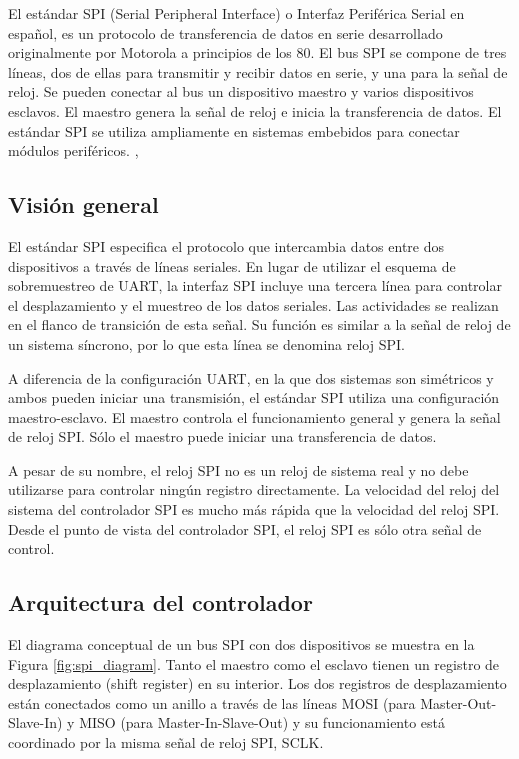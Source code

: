     El estándar SPI (Serial Peripheral Interface) o Interfaz Periférica Serial en español, es un protocolo de transferencia de datos en serie desarrollado originalmente por Motorola a principios de los 80. El bus SPI se compone de tres líneas, dos de ellas para transmitir y recibir datos en serie, y una para la señal de reloj. Se pueden conectar al bus un dispositivo maestro y varios dispositivos esclavos. El maestro genera la señal de reloj e inicia la transferencia de datos. El estándar SPI se utiliza ampliamente en sistemas embebidos para conectar módulos periféricos. \cite{Chu2018}, \cite{Chu2008}

    \subsection{Visión general}

    El estándar SPI especifica el protocolo que intercambia datos entre dos dispositivos a través de líneas seriales. En lugar de utilizar el esquema de sobremuestreo de UART, la interfaz SPI incluye una tercera línea para controlar el desplazamiento y el muestreo de los datos seriales. Las actividades se realizan en el flanco de transición de esta señal. Su función es similar a la señal de reloj de un sistema síncrono, por lo que esta línea se denomina reloj SPI.

    A diferencia de la configuración UART, en la que dos sistemas son simétricos y ambos pueden iniciar una transmisión, el estándar SPI utiliza una configuración maestro-esclavo. El maestro controla el funcionamiento general y genera la señal de reloj SPI. Sólo el maestro puede iniciar una transferencia de datos.

    A pesar de su nombre, el reloj SPI no es un reloj de sistema real y no debe utilizarse para controlar ningún registro directamente. La velocidad del reloj del sistema del controlador SPI es mucho más rápida que la velocidad del reloj SPI. Desde el punto de vista del controlador SPI, el reloj SPI es sólo otra señal de control.

    \subsection{Arquitectura del controlador}

    El diagrama conceptual de un bus SPI con dos dispositivos se muestra en la Figura \ref{fig:spi_diagram}. Tanto el maestro como el esclavo tienen un registro de desplazamiento (shift register) en su interior. Los dos registros de desplazamiento están conectados como un anillo a través de las líneas MOSI (para Master-Out-Slave-In) y MISO (para Master-In-Slave-Out) y su funcionamiento está coordinado por la misma señal de reloj SPI, SCLK. 

